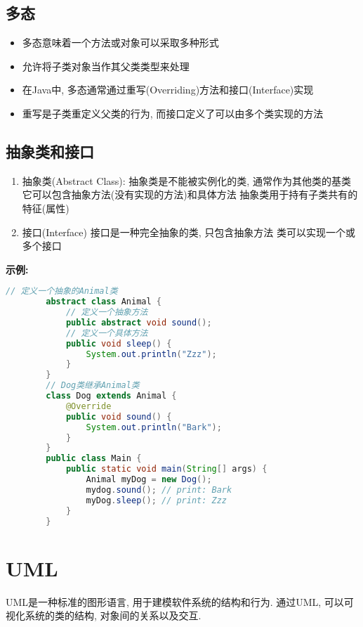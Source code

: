 \documentclass{article}
\begin{document}
\subsection{ 多态}
\begin{itemize}
    \item 多态意味着一个方法或对象可以采取多种形式
    \item 允许将子类对象当作其父类类型来处理
    \item 在Java中, 多态通常通过重写(Overriding)方法和接口(Interface)实现
    \item 重写是子类重定义父类的行为, 而接口定义了可以由多个类实现的方法
\end{itemize}
\subsection{ 抽象类和接口}
\begin{enumerate}
    \item 抽象类(Abstract Class):
    \subitem 抽象类是不能被实例化的类, 通常作为其他类的基类
    \subitem 它可以包含抽象方法(没有实现的方法)和具体方法
    \subitem 抽象类用于持有子类共有的特征(属性)
    \item 接口(Interface)
    \subitem 接口是一种完全抽象的类, 只包含抽象方法
    \subitem 类可以实现一个或多个接口
\end{enumerate}
\textbf{示例:}
\begin{tcolorbox}
    \begin{lstlisting}[language=java]
        // 定义一个抽象的Animal类
        abstract class Animal {
            // 定义一个抽象方法
            public abstract void sound();
            // 定义一个具体方法
            public void sleep() {
                System.out.println("Zzz");
            }
        }
        // Dog类继承Animal类
        class Dog extends Animal {
            @Override
            public void sound() {
                System.out.println("Bark");
            }
        }
        public class Main {
            public static void main(String[] args) {
                Animal myDog = new Dog();
                mydog.sound(); // print: Bark
                myDog.sleep(); // print: Zzz
            }
        }
    \end{lstlisting}
\end{tcolorbox}
\section{ UML}
UML是一种标准的图形语言, 用于建模软件系统的结构和行为. 通过UML, 可以可视化系统的类的结构, 对象间的关系以及交互. 
\end{document}
